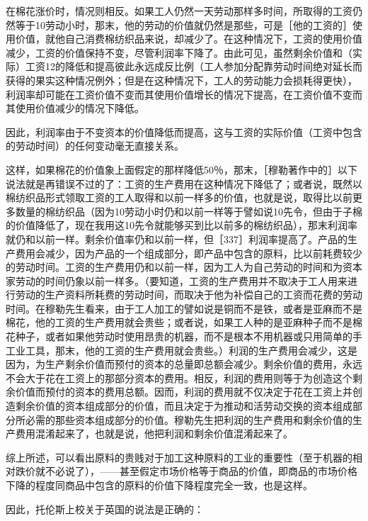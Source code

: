 在棉花涨价时，情况则相反。如果工人仍然一天劳动那样多时间，所取得的工资仍然等于10劳动小时，那末，他的劳动的价值就仍然是那些，可是［他的工资的］使用价值，就他自己消费棉纺织品来说，却减少了。在这种情况下，工资的使用价值减少，工资的价值保持不变，尽管利润率下降了。由此可见，虽然剩余价值和（实际）工资12的降低和提高彼此永远成反比例（工人参加分配靠劳动时间绝对延长而获得的果实这种情况例外；但是在这种情况下，工人的劳动能力会损耗得更快），利润率却可能在工资价值不变而其使用价值增长的情况下提高，在工资价值不变而其使用价值减少的情况下降低。

因此，利润率由于不变资本的价值降低而提高，这与工资的实际价值（工资中包含的劳动时间）的任何变动毫无直接关系。

这样，如果棉花的价值象上面假定的那样降低50％，那末，［穆勒著作中的］以下说法就是再错误不过的了：工资的生产费用在这种情况下降低了；或者说，既然以棉纺织品形式领取工资的工人取得和以前一样多的价值，也就是说，取得比以前更多数量的棉纺织品（因为10劳动小时仍和以前一样等于譬如说10先令，但由于子棉的价值降低了，现在我用这10先令就能够买到比以前多的棉纺织品），那末利润率就仍和以前一样。剩余价值率仍和以前一样，但［337］利润率提高了。产品的生产费用会减少，因为产品的一个组成部分，即产品中包含的原料，比以前耗费较少的劳动时间。工资的生产费用仍和以前一样，因为工人为自己劳动的时间和为资本家劳动的时间仍象以前一样多。（要知道，工资的生产费用并不取决于工人用来进行劳动的生产资料所耗费的劳动时间，而取决于他为补偿自己的工资而花费的劳动时间。在穆勒先生看来，由于工人加工的譬如说是铜而不是铁，或者是亚麻而不是棉花，他的工资的生产费用就会贵些；或者说，如果工人种的是亚麻种子而不是棉花种子，或者如果他劳动时使用昂贵的机器，而不是根本不用机器或只用简单的手工业工具，那末，他的工资的生产费用就会贵些。）利润的生产费用会减少，这是因为，为生产剩余价值而预付的资本的总量即总额会减少。剩余价值的费用，永远不会大于花在工资上的那部分资本的费用。相反，利润的费用则等于为创造这个剩余价值而预付的资本的费用总额。因而，利润的费用就不仅决定于花在工资上并创造剩余价值的资本组成部分的价值，而且决定于为推动和活劳动交换的资本组成部分所必需的那些资本组成部分的价值。穆勒先生把利润的生产费用和剩余价值的生产费用混淆起来了，也就是说，他把利润和剩余价值混淆起来了。

综上所述，可以看出原料的贵贱对于加工这种原料的工业的重要性（至于机器的相对跌价就不必说了），——甚至假定市场价格等于商品的价值，即商品的市场价格下降的程度同商品中包含的原料的价值下降程度完全一致，也是这样。

因此，托伦斯上校关于英国的说法是正确的：

